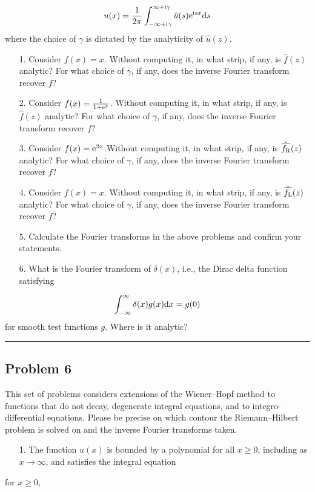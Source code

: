 \documentclass[12pt,a4paper]{article}
\def\D{ {\rm d} }
\def\I{ {\rm i} }
\def\E{ {\rm e} }
\def\dx{\D x}
\def\endash{–}
\begin{document}
\[
u(x) = {1 \over 2\pi} \int_{-\infty + \I \gamma}^{\infty + \I \gamma} \hat u(s) \E^{\I s x} \D s
\]
where the choice of $\gamma$ is dictated by the analyticity of $\hat u(z)$.

\begin{itemize}
\item[1. ] Consider $f(x) = x$. Without computing it, in what strip, if any,  is $\hat f(z)$ analytic? For what choice of $\gamma$, if any, does the inverse Fourier transform recover $f$?


\item[2. ] Consider $f(x) = {1 \over 1+ \E^x}$. Without computing it, in what strip, if any,  is $\hat f(z)$ analytic? For what choice of $\gamma$, if any, does the inverse Fourier transform recover $f$?


\item[3. ] Consider $f(x) = \E^{2 x}$.Without computing it, in what strip, if any, is $\widehat{f_{\rm R}}(z)$ analytic? For what choice of $\gamma$, if any, does the inverse Fourier transform recover $f$?


\item[4. ] Consider $f(x) = x$. Without computing it, in what strip, if any, is $\widehat{f_{\rm L}}(z)$ analytic? For what choice of $\gamma$, if any, does the inverse Fourier transform recover $f$?


\item[5. ] Calculate the Fourier transforms in the above problems and confirm your statements.


\item[6. ] What is the Fourier transform of $\delta(x)$, i.e., the Dirac delta function satisfying

\end{itemize}
\[
\int_{-\infty}^\infty \delta(x) g(x) \dx = g(0)
\]
for smooth test functions $g$. Where is it analytic?

\rule{\textwidth}{1pt}
\subsection{Problem 6}
This set of problems considers extensions of the Wiener\ensuremath{\endash}Hopf method to functions that do not decay, degenerate integral equations,  and to integro-differential equations. Please be precise on which contour the Riemann\ensuremath{\endash}Hilbert problem is solved on and the  inverse Fourier transforms  taken.

\begin{itemize}
\item[1. ] The function $u(x)$ is bounded by a polynomial for all $x \geq 0$, including as $x \rightarrow \infty$, and satisfies the integral equation

\end{itemize}
for $x \geq 0$,
\end{document}
